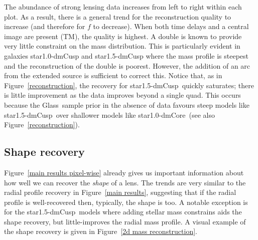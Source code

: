 \documentclass[galley,usenatbib]{mn2e}
\newcommand{\Glass}{{\sc Glass}}
\newcommand{\figref}[1] {Figure~\ref{#1}}
\newcommand{\mockAA}{{\sc star1.0-dmCore}}
\newcommand{\mockAC}{{\sc star1.0-dmCusp}}
\newcommand{\mockBC}{{\sc star1.5-dmCusp}}
\begin{document}
The abundance of strong lensing data increases from left to right within each
plot. As a result, there is a general trend for the reconstruction quality to
increase (and therefore for $f$ to decrease). When both time delays and
a central image are present (TM), the quality is highest. A double is known to
provide very little constraint on the mass distribution. This is particularly
evident in galaxies \mockAC{} and \mockBC{} where the mass profile is steepest
and the reconstruction of the double is poorest. However, the addition of an
arc from the extended source is sufficient to correct this. Notice that, as in \figref{reconstruction}, the recovery for \mockBC\ quickly saturates; there is little improvement as the data improves beyond a single quad. This occurs because the \Glass\ sample prior in the absence of data favours steep models like \mockBC\ over shallower models like \mockAA\ (see also \figref{reconstruction}). 

\subsection{Shape recovery}\label{sec:shape}

\figref{main results pixel-wise} already gives us important information about
how well we can recover the {\it shape} of a lens. The trends are very similar
to the radial profile recovery in \figref{main results}, suggesting that if the
radial profile is well-recovered then, typically, the shape is too. A notable
exception is for the \mockBC\ models where adding stellar mass constrains aids
the shape recovery, but little-improves the radial mass profile. A visual
example of the shape recovery is given in \figref{2d mass reconstruction}.
\end{document}
